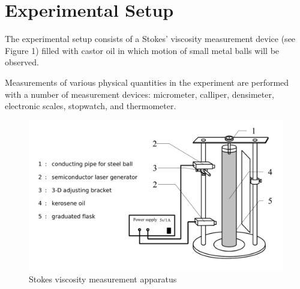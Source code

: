\section{Experimental Setup}

The experimental setup consists of a Stokes’ viscosity measurement device (see
Figure 1) filled with castor oil in which motion of small metal balls will be
observed.

Measurements of various physical quantities in the experiment are performed with
a number of measurement devices: micrometer, calliper, densimeter, electronic
scales, stopwatch, and thermometer.

\begin{figure}[H]
\centering
\includegraphics[width=12cm]{fig/p1}
\caption{Stokes viscosity measurement apparatus}
\end{figure}

